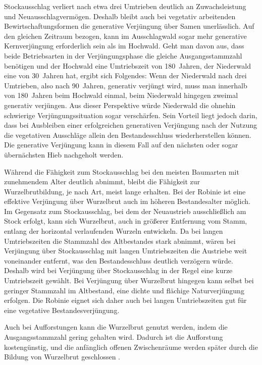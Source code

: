 \documentclass[twocolumn]{scrartcl}
\begin{document}
Stockausschlag verliert nach etwa drei Umtrieben deutlich an Zuwachsleistung und
Neuausschlagvermögen.
Deshalb bleibt auch bei vegetativ arbeitenden Bewirtschaftungsformen
die generative Verjüngung über Samen unerlässlich.
Auf den gleichen Zeitraum bezogen, kann im Ausschlagwald sogar
mehr generative Kernverjüngung erforderlich sein als im Hochwald. Geht man davon
aus, dass beide Betriebsarten in der Verjüngungsphase die gleiche
Ausgangsstammzahl benötigen und der Hochwald eine Umtriebszeit von 180~Jahren,
der Niederwald eine von 30~Jahren hat, ergibt sich Folgendes: Wenn der
Niederwald nach drei Umtrieben, also nach 90~Jahren, generativ verjüngt wird,
muss man innerhalb von 180~Jahren beim Hochwald einmal, beim Niederwald hingegen
zweimal generativ verjüngen.
Aus dieser Perspektive würde Niederwald die ohnehin
schwierige Verjüngungssituation sogar verschärfen.
Sein Vorteil liegt jedoch darin, dass bei Ausbleiben einer
erfolgreichen generativen Verjüngung nach der Nutzung die vegetativen
Ausschläge allein den Bestandesschluss wiederherstellen können. Die
generative Verjüngung kann in diesem Fall auf den nächsten oder sogar
übernächsten Hieb nachgeholt werden.


Während die Fähigkeit zum Stockausschlag bei den meisten Baumarten mit
zunehmendem Alter deutlich abnimmt, bleibt die Fähigkeit zur
Wurzelbrutbildung, je nach Art, meist lange erhalten. Bei der Robinie
ist eine effektive Verjüngung über Wurzelbrut auch im höheren
Bestandesalter möglich. Im Gegensatz zum Stockausschlag, bei dem der
Neuaustrieb ausschließlich am Stock erfolgt, kann sich Wurzelbrut,
auch in größerer Entfernung vom Stamm, entlang der horizontal
verlaufenden Wurzeln entwickeln. Da bei langen Umtriebszeiten die
Stammzahl des Altbestandes stark abnimmt, wären bei Verjüngung über
Stockausschlag mit langen Umtriebszeiten die Austriebe weit
voneinander entfernt, was den Bestandesschluss deutlich verzögern
würde. Deshalb wird bei Verjüngung über Stockausschlag in der Regel
eine kurze Umtriebszeit gewählt. Bei Verjüngung über Wurzelbrut
hingegen kann selbst bei geringer Stammzahl im Altbestand, eine dichte
und flächige Naturverjüngung erfolgen. Die Robinie eignet sich daher
auch bei langen Umtriebszeiten gut für eine vegetative
Bestandesverjüngung.

Auch bei Aufforstungen kann die Wurzelbrut genutzt werden, indem die
Ausgangsstammzahl gering gehalten wird. Dadurch ist die Aufforstung
kostengünstig, und die anfänglich offenen Zwischenräume werden später
durch die Bildung von Wurzelbrut geschlossen
\citep{larsen1935robinieWurzelbrut}.
\end{document}

